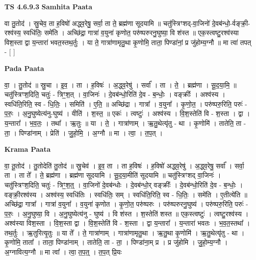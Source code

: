 \documentclass[17pt]{extarticle}
\begin{document}
\textbf{TS 4.6.9.3 } \newline
\textbf{Samhita Paata} \newline

वा तु॒तोद॑ । स्रु॒चेव॒ ता ह॒विषो॑ अद्ध्व॒रेषु॒ सर्वा॒ ता ते॒ ब्रह्म॑णा सूदयामि ॥ चतु॑स्त्रिꣳशद्-वा॒जिनो॑ दे॒वब॑न्धो॒-र्वङ्क्री॒-रश्व॑स्य॒ स्वधि॑तिः॒ समे॑ति । अच्छि॑द्रा॒ गात्रा॑ व॒युना॑ कृणोत॒ परु॑ष्परुरनु॒घुष्या॒ वि श॑स्त ॥ एक॒स्त्वष्टु॒रश्व॑स्या विश॒स्ता द्वा य॒न्तारा॑ भवत॒स्तथ॒र्तुः । या ते॒ गात्रा॑णामृतु॒था कृ॒णोमि॒ ताता॒ पिण्डा॑नां॒ प्र जु॑होम्य॒ग्नौ ॥ मा त्वा॑ तपत् - [  ] \newline

\textbf{Pada Paata} \newline

वा॒ । तु॒तोद॑ ॥ स्रु॒चा । इ॒व॒ । ता । ह॒विषः॑ । अ॒द्ध्व॒रेषु॑ । सर्वा᳚ । ता । ते॒ । ब्रह्म॑णा । सू॒द॒या॒मि॒ ॥ चतु॑स्त्रिꣳश॒दिति॒ चतुः॑ - त्रिꣳ॒॒श॒त् । वा॒जिनः॑ । दे॒वब॑न्धो॒रिति॑ दे॒व - ब॒न्धोः॒ । वङ्क्रीः᳚ । अश्व॑स्य । स्वधि॑ति॒रिति॒ स्व - धि॒तिः॒ । समिति॑ । ए॒ति॒ ॥ अच्छि॑द्रा । गात्रा᳚ । व॒युना᳚ । कृ॒णो॒त॒ । परु॑ष्परु॒रिति॒ परुः॑ - प॒रुः॒ । अ॒नु॒घुष्येत्य॑नु-घुष्य॑ । वीति॑ । श॒स्त॒ ॥ एकः॑ । त्वष्टुः॑ । अश्व॑स्य । वि॒श॒स्तेति॑ वि - श॒स्ता । द्वा । य॒न्तारा᳚ । भ॒व॒तः॒ । तथा᳚ । ऋ॒तुः ॥ या । ते॒ । गात्रा॑णाम् । ऋ॒तु॒थेत्यृ॑तु - था । कृ॒णोमि॑ । तातेति॒ ता - ता॒ । पिण्डा॑नाम् । प्रेति॑ । जु॒हो॒मि॒ । अ॒ग्नौ ॥ मा । त्वा॒ । त॒प॒त् ।  \newline


\textbf{Krama Paata} \newline

वा॒ तू॒तोद॑ । तु॒तोदेति॑ तु॒तोद॑ ॥ स्रु॒चेव॑ । इ॒व॒ ता । ता ह॒विषः॑ । ह॒विषो॑ अद्ध्व॒रेषु॑ । अ॒द्ध्व॒रेषु॒ सर्वा᳚ । सर्वा॒ ता । ता ते᳚ । ते॒ ब्रह्म॑णा । ब्रह्म॑णा सूदयामि । सू॒द॒या॒मीति॑ सूदयामि ॥ चतु॑स्त्रिꣳशद् वा॒जिनः॑ । चतु॑स्त्रिꣳश॒दिति॒ चतुः॑ - त्रिꣳ॒॒श॒त्॒ । वा॒जिनो॑ दे॒वब॑न्धोः । दे॒वब॑न्धो॒र् वङ्क्रीः᳚ । दे॒वब॑न्धो॒रिति॑ दे॒व - ब॒न्धोः॒ । वङ्क्री॒रश्व॑स्य । अश्व॑स्य॒ स्वधि॑तिः । स्वधि॑तिः॒ सम् । स्वधि॑ति॒रिति॒ स्व - धि॒तिः॒ । समे॑ति । ए॒तीत्ये॑ति ॥ अच्छि॑द्रा॒ गात्रा᳚ । गात्रा॑ व॒युना᳚ । व॒युना॑ कृणोत । कृ॒णो॒त॒ परु॑ष्परुः । परु॑ष्परुरनु॒घुष्य॑ । परु॑ष्परु॒रिति॒ परुः॑ - प॒रुः॒ । अ॒नु॒घुष्या॒ वि । अ॒नु॒घुष्येत्य॑नु - घुष्य॑ । वि श॑स्त । 
श॒स्तेति॑ शस्त ॥ एक॒स्त्वष्टुः॑ । त्वष्टु॒रश्व॑स्य । अश्व॑स्या विश॒स्ता । वि॒श॒स्ता द्वा । वि॒श॒स्तेति॑ वि - श॒स्ता । द्वा य॒न्तारा᳚ । य॒न्तारा॑ भवतः । भ॒व॒त॒स्तथा᳚ । तथ॒र्तुः । ऋ॒तुरित्यृ॒तुः ॥ या ते᳚ । ते॒ गात्रा॑णाम् । गात्रा॑णामृतु॒था । ऋ॒तु॒था कृ॒णोमि॑ । ऋ॒तु॒थेत्यृ॑तु - था । कृ॒णोमि॒ ताता᳚ । ताता॒ पिण्डा॑नाम् । तातेति॒ ता - ता॒ । पिण्डा॑ना॒म् प्र । प्र जु॑होमि । जु॒हो॒म्य॒ग्नौ । अ॒ग्नावित्य॒ग्नौ ॥ मा त्वा᳚ । त्वा॒ त॒प॒त्॒ । त॒प॒त् प्रि॒यः \newline
\end{document}
